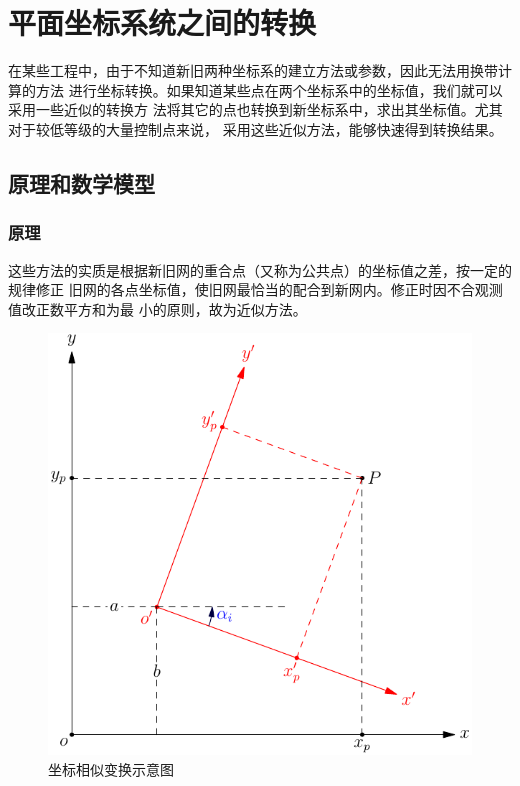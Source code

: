 ﻿%

\chapter{平面坐标系统之间的转换}

在某些工程中，由于不知道新旧两种坐标系的建立方法或参数，因此无法用换带计算的方法
进行坐标转换。如果知道某些点在两个坐标系中的坐标值，我们就可以采用一些近似的转换方
法将其它的点也转换到新坐标系中，求出其坐标值。尤其对于较低等级的大量控制点来说，
采用这些近似方法，能够快速得到转换结果。

 \section{原理和数学模型}

\subsection{原理}
这些方法的实质是根据新旧网的重合点（又称为公共点）的坐标值之差，按一定的规律修正
旧网的各点坐标值，使旧网最恰当的配合到新网内。修正时因不合观测值改正数平方和为最
小的原则，故为近似方法。

\begin{figure}[htbp]
    \centering
    \includegraphics[scale=1]{xytoxy/xytoxy.pdf}
    \caption{坐标相似变换示意图}
    \label{fig:xytoxy}
\end{figure}

